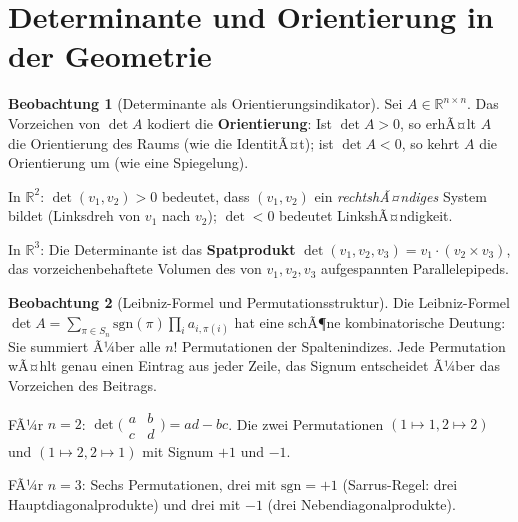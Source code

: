 ﻿\documentclass[a4paper,12pt]{report}
\theoremstyle{definition}
\newtheorem{beobachtung}{Beobachtung}
\begin{document}
\section{Determinante und Orientierung in der Geometrie}

\begin{beobachtung}[Determinante als Orientierungsindikator]
    Sei $A \in \mathbb{R}^{n \times n}$. Das Vorzeichen von $\det A$
    kodiert die \textbf{Orientierung}: Ist $\det A > 0$, so erhÃ¤lt
    $A$ die Orientierung des Raums (wie die IdentitÃ¤t); ist
    $\det A < 0$, so kehrt $A$ die Orientierung um (wie eine
    Spiegelung).

    In $\mathbb{R}^2$: $\det(v_1, v_2) > 0$ bedeutet, dass $(v_1, v_2)$
    ein \emph{rechtshÃ¤ndiges} System bildet (Linksdreh von $v_1$ nach $v_2$);
    $\det < 0$ bedeutet LinkshÃ¤ndigkeit.

    In $\mathbb{R}^3$: Die Determinante ist das \textbf{Spatprodukt}
    $\det(v_1, v_2, v_3) = v_1 \cdot (v_2 \times v_3)$, das vorzeichenbehaftete
    Volumen des von $v_1, v_2, v_3$ aufgespannten Parallelepipeds.
\end{beobachtung}

\begin{beobachtung}[Leibniz-Formel und Permutationsstruktur]
    Die Leibniz-Formel $\det A = \sum_{\pi \in S_n} \mathrm{sgn}(\pi)
    \prod_i a_{i,\pi(i)}$ hat eine schÃ¶ne kombinatorische Deutung:
    Sie summiert Ã¼ber alle $n!$ Permutationen der Spaltenindizes.
    Jede Permutation wÃ¤hlt genau einen Eintrag aus jeder Zeile,
    das Signum entscheidet Ã¼ber das Vorzeichen des Beitrags.

    FÃ¼r $n = 2$: $\det\bigl(\begin{smallmatrix}a & b \\ c & d\end{smallmatrix}\bigr)
    = ad - bc$. Die zwei Permutationen $(1\mapsto 1, 2\mapsto 2)$ und
    $(1\mapsto 2, 2\mapsto 1)$ mit Signum $+1$ und $-1$.

    FÃ¼r $n = 3$: Sechs Permutationen, drei mit $\mathrm{sgn} = +1$
    (Sarrus-Regel: drei Hauptdiagonalprodukte) und drei mit $-1$
    (drei Nebendiagonalprodukte).
\end{beobachtung}
\end{document}
